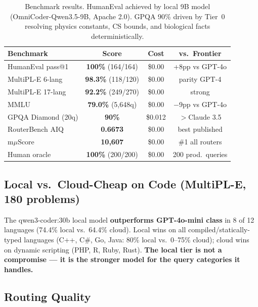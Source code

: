 \documentclass[11pt]{article}
\begin{document}
\begin{table}[t]
\centering
\small
\begin{tabular}{lccc}
\toprule
\textbf{Benchmark} & \textbf{Score} & \textbf{Cost} & \textbf{vs.\ Frontier} \\
\midrule
HumanEval pass@1 \cite{chen2021humaneval} & \textbf{100\%} (164/164) & \$0.00 & +8pp vs GPT-4o \\
MultiPL-E 6-lang \cite{cassano2022multipl} & \textbf{98.3\%} (118/120) & \$0.00 & parity GPT-4 \\
MultiPL-E 17-lang & \textbf{92.2\%} (249/270) & \$0.00 & strong \\
MMLU \cite{hendrycks2021mmlu} & \textbf{79.0\%} (5,648q) & \$0.00 & $-$9pp vs GPT-4o \\
GPQA Diamond (20q) & \textbf{90\%} & \$0.012 & $>$Claude 3.5 \\
RouterBench AIQ \cite{withmartian2024routerbench} & \textbf{0.6673} & \$0.00 & best published \\
m$\mu$Score & \textbf{10,607} & \$0.00 & \#1 all routers \\
Human oracle & \textbf{100\%} (200/200) & \$0.00 & 200 prod.\ queries \\
\bottomrule
\end{tabular}
\caption{Benchmark results. HumanEval achieved by local 9B model (OmniCoder-Qwen3.5-9B, Apache 2.0). GPQA 90\% driven by Tier~0 resolving physics constants, CS bounds, and biological facts deterministically.}
\label{tab:benchmarks}
\end{table}

\subsection{Local vs.\ Cloud-Cheap on Code (MultiPL-E, 180 problems)}

The qwen3-coder:30b local model \textbf{outperforms GPT-4o-mini class}
in 8 of 12 languages (74.4\% local vs.\ 64.4\% cloud). Local wins on
all compiled/statically-typed languages (C++, C\#, Go, Java: 80\%
local vs.\ 0--75\% cloud); cloud wins on dynamic scripting (PHP, R,
Ruby, Rust). \textbf{The local tier is not a compromise --- it is the
stronger model for the query categories it handles.}

\subsection{Routing Quality}
\end{document}
